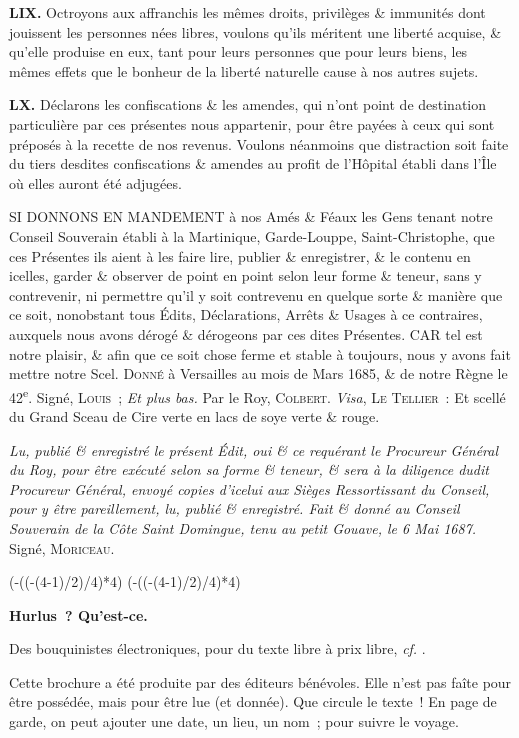 \documentclass[french,twoside]{book} %
\newcommand{\labelchar}[1]{\textbf{\color{rubric} #1}}
\def\truncdiv#1#2{((#1-(#2-1)/2)/#2)}
\def\moduloop#1#2{(#1-\truncdiv{#1}{#2}*#2)}
\def\modulo#1#2{\number\numexpr\moduloop{#1}{#2}\relax}
\begin{document}
\labelchar{LIX.} Octroyons aux affranchis les mêmes droits, privilèges \& immunités dont jouissent les personnes nées libres, voulons qu’ils méritent une liberté acquise, \& qu’elle produise en eux, tant pour leurs personnes que pour leurs biens, les mêmes effets que le bonheur de la liberté naturelle cause à nos autres sujets.\par
\labelchar{LX.} Déclarons les confiscations \& les amendes, qui n’ont point de destination particulière par ces présentes nous appartenir, pour être payées à ceux qui sont préposés à la recette de nos revenus. Voulons néanmoins que distraction soit faite du tiers desdites confiscations \& amendes au profit de l’Hôpital établi dans l’Île où elles auront été adjugées.\par
SI DONNONS EN MANDEMENT à nos Amés \& Féaux les Gens tenant notre Conseil Souverain établi à la Martinique, Garde-Louppe, Saint-Christophe, que ces Présentes ils aient à les faire lire, publier \& enregistrer, \& le contenu en icelles, garder \& observer de point en point selon leur forme \& teneur, sans y contrevenir, ni permettre qu’il y soit contrevenu en quelque sorte \& manière que ce soit, nonobstant tous Édits, Déclarations, Arrêts \& Usages à ce contraires, auxquels nous avons dérogé \& dérogeons par ces dites Présentes. CAR tel est notre plaisir, \& afin que ce soit chose ferme et stable à toujours, nous y avons fait mettre notre Scel. {\scshape Donné} à Versailles au mois de Mars 1685, \& de notre Règne le 42\textsuperscript{e}. Signé, {\scshape Louis} ; \emph{Et plus bas.} Par le Roy, {\scshape Colbert}. \emph{Visa}, {\scshape Le Tellier} : Et scellé du Grand Sceau de Cire verte en lacs de soye verte \& rouge.\par
\emph{Lu, publié \& enregistré le présent Édit, oui \& ce requérant le Procureur Général du Roy, pour être exécuté selon sa forme \& teneur, \& sera à la diligence dudit Procureur Général, envoyé copies d’icelui aux Sièges Ressortissant du Conseil, pour y être pareillement, lu, publié \& enregistré. Fait \& donné au Conseil Souverain de la Côte Saint Domingue, tenu au petit Gouave, le 6 Mai 1687.} Signé, {\scshape Moriceau}.
 


\ifbooklet
  \pagestyle{empty}
  \clearpage
  \ifnum\modulo{\value{page}}{4}=3 \hbox{}\newpage\hbox{}\newpage\fi
  \ifnum\modulo{\value{page}}{4}=0 \hbox{}\newpage\hbox{}\newpage\fi


  \hbox{}\newpage
  \ifodd\value{page}\hbox{}\newpage\fi
  {\centering\color{rubric}\bfseries\noindent\large
    Hurlus ? Qu’est-ce.\par
    \bigskip
  }
  \noindent Des bouquinistes électroniques, pour du texte libre à prix libre,
  \textit{cf.} \href{https://hurlus.fr}{}.\par
  \bigskip
  \noindent Cette brochure a été produite par des éditeurs bénévoles.
  Elle n’est pas faîte pour être possédée, mais pour être lue (et donnée).
  Que circule le texte !
  En page de garde, on peut ajouter une date, un lieu, un nom ;
  pour suivre le voyage.
  \par
\end{document}
